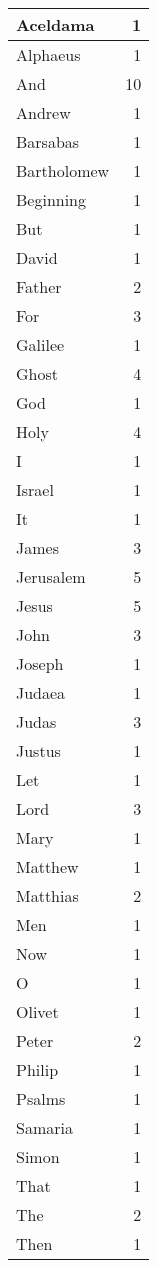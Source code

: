 \begin{center}
\begin{longtable}{l|r}
\hline \hline
\endlastfoot
Aceldama & 1 \\ \hline
Alphaeus & 1 \\ \hline
And & 10 \\ \hline
Andrew & 1 \\ \hline
Barsabas & 1 \\ \hline
Bartholomew & 1 \\ \hline
Beginning & 1 \\ \hline
But & 1 \\ \hline
David & 1 \\ \hline
Father & 2 \\ \hline
For & 3 \\ \hline
Galilee & 1 \\ \hline
Ghost & 4 \\ \hline
God & 1 \\ \hline
Holy & 4 \\ \hline
I & 1 \\ \hline
Israel & 1 \\ \hline
It & 1 \\ \hline
James & 3 \\ \hline
Jerusalem & 5 \\ \hline
Jesus & 5 \\ \hline
John & 3 \\ \hline
Joseph & 1 \\ \hline
Judaea & 1 \\ \hline
Judas & 3 \\ \hline
Justus & 1 \\ \hline
Let & 1 \\ \hline
Lord & 3 \\ \hline
Mary & 1 \\ \hline
Matthew & 1 \\ \hline
Matthias & 2 \\ \hline
Men & 1 \\ \hline
Now & 1 \\ \hline
O & 1 \\ \hline
Olivet & 1 \\ \hline
Peter & 2 \\ \hline
Philip & 1 \\ \hline
Psalms & 1 \\ \hline
Samaria & 1 \\ \hline
Simon & 1 \\ \hline
That & 1 \\ \hline
The & 2 \\ \hline
Then & 1 \\ \hline

\end{longtable}
\end{center}
